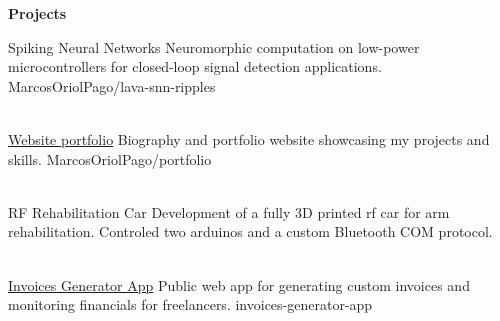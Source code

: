 \begin{tcolorbox}[vercelcard]
\textcolor{DockerBlue}{\large\textbf{Projects}}

\vspace{8pt}

\projectitem
    {Spiking Neural Networks}
    {Neuromorphic computation on low-power microcontrollers for closed-loop signal detection applications.}
    {MarcosOriolPago/lava-snn-ripples}

\vspace{4pt}
\\[10pt]

\projectitem
    {\href{https://marcos.oriol-tech.com}{\faGlobe Website portfolio}}
    {Biography and portfolio website showcasing my projects and skills.}
    {MarcosOriolPago/portfolio}
    
\vspace{4pt}
\\[10pt]

\projectitem
    {RF Rehabilitation Car}
    {Development of a fully 3D printed rf car for arm rehabilitation. Controled two arduinos and a custom Bluetooth COM protocol.}
    {}

\\[10pt]

\projectitem
    {\href{https://invoices.oriol-tech.com}{\faGlobe Invoices Generator App}}
    {Public web app for generating custom invoices and monitoring financials for freelancers.}
    {invoices-generator-app}

\vspace{4pt}
\\[10pt]

\end{tcolorbox}
